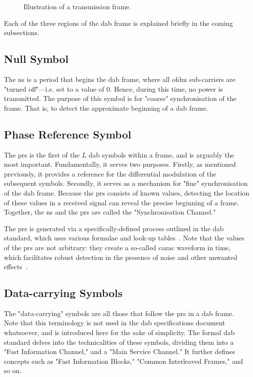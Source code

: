 \documentclass[class=report,11pt,crop=false]{standalone}
\begin{document}
\begin{figure}[htbp]
    \centering
    \captionsetup{type=figure}
    \def\svgwidth{1\linewidth}
    { %
    \scriptsize
    }
    \caption{Illustration of a  transmission frame.}
    \label{fig:transmission-frame-illustration}
\end{figure}

Each of the three regions of the \gls{dab} frame is explained briefly in the coming subsections.

\subsection{Null Symbol \label{subsect:dab-std_null}}
The \gls{ns} is a period that begins the \gls{dab} frame, where all \gls{ofdm} sub-carriers are "turned off"---i.e. set to a value of 0. Hence, during this time, no power is transmitted. The purpose of this symbol is for "coarse" synchronisation of the frame. That is, to detect the approximate beginning of a \gls{dab} frame.

\subsection{Phase Reference Symbol \label{subsect:dab-std_prs}}
The \gls{prs} is the first of the \(L\) \gls{dab} symbols within a frame, and is arguably the most important. Fundamentally, it serves two purposes. Firstly, as mentioned previously, it provides a reference for the differential modulation of the subsequent symbols. Secondly, it serves as a mechanism for "fine" synchronisation of the \gls{dab} frame. Because the \gls{prs} consists of known values, detecting the location of these values in a received signal can reveal the precise beginning of a frame. Together, the \gls{ns} and the \gls{prs} are called the "Synchronisation Channel."

The \gls{prs} is generated via a specifically-defined process outlined in the \gls{dab} standard, which uses various formulae and look-up tables~\cite{dabstandard}. Note that the values of the \gls{prs} are not arbitrary: they create a so-called \gls{cazac} waveform in time, which facilitates robust detection in the presence of noise and other unwanted effects~\cite{gandy2003dab}.

\subsection{Data-carrying Symbols \label{subsect:dab-std_data}}
The "data-carrying" symbols are all those that follow the \gls{prs} in a \gls{dab} frame. Note that this terminology is not used in the \gls{dab} specifications document whatsoever, and is introduced here for the sake of simplicity. The formal \gls{dab} standard delves into the technicalities of these symbols, dividing them into a "Fast Information Channel," and a "Main Service Channel." It further defines concepts such as "Fast Information Blocks," "Common Interleaved Frames," and so on.
\end{document}
